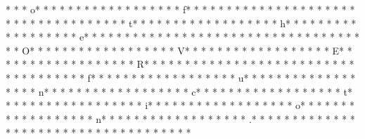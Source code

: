 * *  * o* * *  * * *  * * *  *  * * *  *  * * *  * f* * *  * * *  * * *  *  * * *  *  * * *  *  * * *  * * *  * * *  *  * * *  *  * * *  * t* * *  * * *  * * *  *  * * *  *  * * *  * h* * *  * * *  * * *  *  * * *  *  * * *  * e* * *  * * *  * * *  *  * * *  *  * * *  *  * * *  * * *  * * *  *  * * *  *  * * *  * O* * *  * * *  * * *  *  * * *  *  * * *  * V* * *  * * *  * * *  *  * * *  *  * * *  * E* * *  * * *  * * *  *  * * *  *  * * *  * R* * *  * * *  * * *  *  * * *  *  * * *  *  * * *  * * *  * * *  *  * * *  *  * * *  * f* * *  * * *  * * *  *  * * *  *  * * *  * u* * *  * * *  * * *  *  * * *  *  * * *  * n* * *  * * *  * * *  *  * * *  *  * * *  * c* * *  * * *  * * *  *  * * *  *  * * *  * t* * *  * * *  * * *  *  * * *  *  * * *  * i* * *  * * *  * * *  *  * * *  *  * * *  * o* * *  * * *  * * *  *  * * *  *  * * *  * n* * *  * * *  * * *  *  * * *  *  * * *  * .* * *  * * *  * * *  *  * * *  *  * * *  * 
* * *  * * *  * * *  *  * * *  *  * * *  * 
